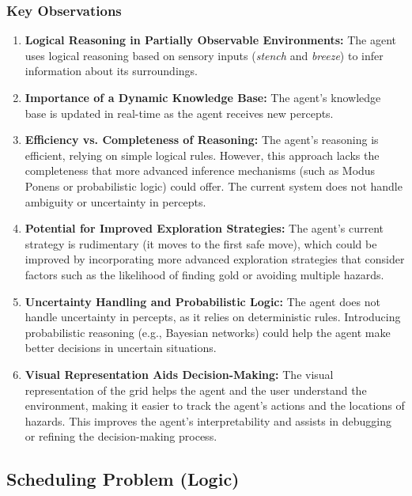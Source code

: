 \documentclass[12pt]{article}
\begin{document}
\subsubsection{Key Observations}
\begin{enumerate}
    \item \textbf{Logical Reasoning in Partially Observable Environments:} The agent uses logical reasoning based on sensory inputs (\textit{stench} and \textit{breeze}) to infer information about its surroundings.

    \item \textbf{Importance of a Dynamic Knowledge Base:} The agent’s knowledge base is updated in real-time as the agent receives new percepts.

    \item \textbf{Efficiency vs. Completeness of Reasoning:} The agent’s reasoning is efficient, relying on simple logical rules. However, this approach lacks the completeness that more advanced inference mechanisms (such as Modus Ponens or probabilistic logic) could offer. The current system does not handle ambiguity or uncertainty in percepts.

    \item \textbf{Potential for Improved Exploration Strategies:} The agent’s current strategy is rudimentary (it moves to the first safe move), which could be improved by incorporating more advanced exploration strategies that consider factors such as the likelihood of finding gold or avoiding multiple hazards.

    \item \textbf{Uncertainty Handling and Probabilistic Logic:} The agent does not handle uncertainty in percepts, as it relies on deterministic rules. Introducing probabilistic reasoning (e.g., Bayesian networks) could help the agent make better decisions in uncertain situations.

    \item \textbf{Visual Representation Aids Decision-Making:} The visual representation of the grid helps the agent and the user understand the environment, making it easier to track the agent’s actions and the locations of hazards. This improves the agent's interpretability and assists in debugging or refining the decision-making process.
\end{enumerate}




\subsection{Scheduling Problem (Logic)}
\end{document}
